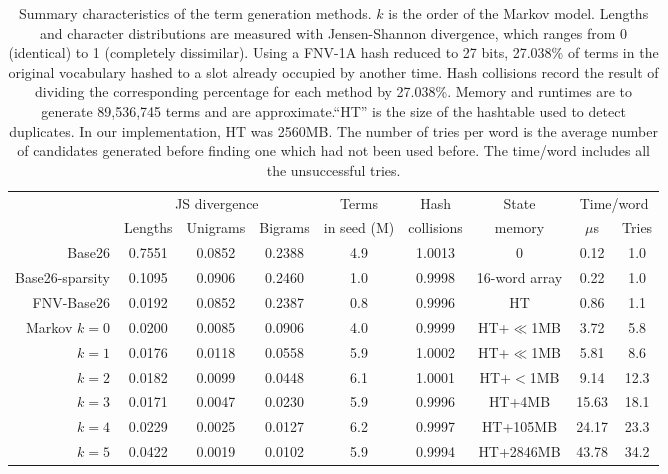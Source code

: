 \documentclass[11pt]{report}
\newcommand{\Z}{\hphantom{0}}
\begin{document}
\begin{table}[t] \tiny
\centering
\caption{ Summary characteristics of the term generation methods. $k$
  is the order of the Markov model. Lengths and character
  distributions are measured with Jensen-Shannon divergence, which
  ranges from 0 (identical) to 1 (completely dissimilar). Using 
  a FNV-1A hash reduced to 27 bits, 27.038\% of terms in the original 
  vocabulary hashed to a slot already occupied by another time. Hash 
  collisions record the result of dividing the corresponding
  percentage for each method by 27.038\%. Memory and
  runtimes are to generate 89,536,745 terms and are
  approximate.``HT'' is the size of the hashtable used to detect
  duplicates. In our implementation, HT was 2560MB.   The number of tries per word is the average number of
  candidates generated before finding one which had not been used
  before.  The time/word includes all the unsuccessful tries.}
\label{tab:summary}
\begin{tabular}{rcccccccc}
             & \multicolumn{3}{c}{JS divergence} & Terms      & Hash       & State  & \multicolumn{2}{c}{Time/word} \\
             & Lengths & Unigrams & Bigrams      & in seed (M)& collisions & memory & $\mu$s & Tries                \\
\cmidrule(lr){2-4}\cmidrule(lr){5-5}\cmidrule(lr){6-6}\cmidrule(lr){7-7}\cmidrule(lr){8-9}
Base26       & 0.7551  & 0.0852  & 0.2388    & \Z4.9      & 1.0013     & 0       & \Z0.12 & \Z1.0               \\
Base26-sparsity 
             & 0.1095  & 0.0906  & 0.2460   & \Z1.0      & 0.9998     & 16-word array & \Z0.22 & \Z1.0    \\
FNV-Base26   & 0.0192  & 0.0852 & 0.2387    & \Z0.8      & 0.9996     & HT      & \Z0.86 & \Z1.1               \\
Markov $k=0$ & 0.0200  & 0.0085  & 0.0906   & \Z4.0      & 0.9999     & HT+$\ll$1MB   & \Z3.72 & \Z5.8    \\
\hfill $k=1$ & 0.0176  & 0.0118 & 0.0558    & \Z5.9      & 1.0002     & HT+$\ll$1MB   & \Z5.81 & \Z8.6    \\
\hfill $k=2$ & 0.0182  & 0.0099 & 0.0448    & \Z6.1      & 1.0001     & HT+$<$1MB     & \Z9.14 & 12.3     \\
\hfill $k=3$ & 0.0171  & 0.0047 & 0.0230    & \Z5.9      & 0.9996     & HT+4MB    & 15.63 & 18.1               \\
\hfill $k=4$ & 0.0229  & 0.0025 & 0.0127    & \Z6.2      & 0.9997     & HT+105MB  & 24.17 & 23.3               \\
\hfill $k=5$ & 0.0422  & 0.0019 & 0.0102    & \Z5.9      & 0.9994     & HT+2846MB & 43.78 & 34.2               \\
\bottomrule
\end{tabular}
\end{table}
\end{document}
